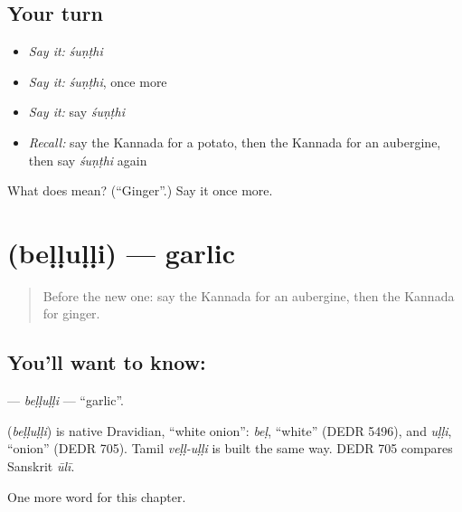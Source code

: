 \subsection*{Your turn}
\begin{itemize}
\raggedright
  \item \emph{Say it:} \emph{śuṇṭhi}
  \item \emph{Say it:} \emph{śuṇṭhi}, once more
  \item \emph{Say it:} say \emph{śuṇṭhi}
  \item \emph{Recall:} say the Kannada for a potato, then the Kannada for an aubergine, then say \emph{śuṇṭhi} again
\end{itemize}

\begin{tcolorbox}[breakable,colback=teal!4,colframe=teal!35!black,title={Before you move on}]
What does  mean? (\textquotedblleft{}Ginger\textquotedblright{}.) Say it once more.
\end{tcolorbox}
\section[\texorpdfstring{\kn{ಬೆಳ್ಳುಳ್ಳಿ} (beḷḷuḷḷi)}{ಬೆಳ್ಳುಳ್ಳಿ (beḷḷuḷḷi)}]{ (beḷḷuḷḷi) — garlic}

\label{lesson:KA-C124-bellulli}



\begin{quote}
Before the new one: say the Kannada for an aubergine, then the Kannada for ginger.
\end{quote}

\subsection*{You'll want to know: }
\textbf{} — \emph{beḷḷuḷḷi} — \textquotedblleft{}garlic\textquotedblright{}.

\begin{cousinweb}
\textbf{} (\emph{beḷḷuḷḷi}) is native Dravidian, \textquotedblleft{}white onion\textquotedblright{}: \emph{beḷ}, \textquotedblleft{}white\textquotedblright{} (DEDR 5496), and \emph{uḷḷi}, \textquotedblleft{}onion\textquotedblright{} (DEDR 705). Tamil \emph{veḷḷ-uḷḷi} is built the same way. DEDR 705 compares Sanskrit \emph{ūlī}.
\end{cousinweb}

\begin{grammarlens}[title={What you've built}]
One more word for this chapter.
\end{grammarlens}

